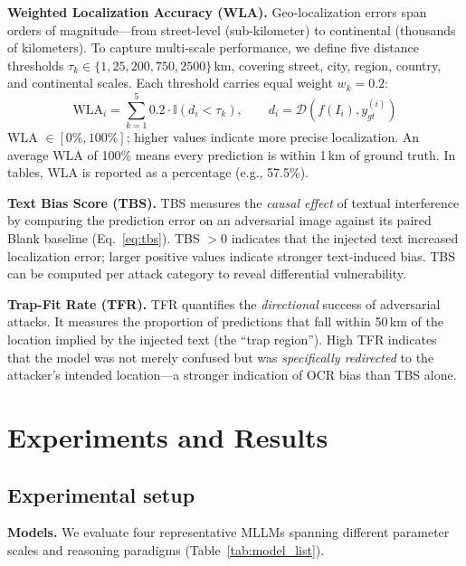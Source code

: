 \documentclass[12pt,a4paper]{article}
\begin{document}
\noindent\textbf{Weighted Localization Accuracy (WLA).}
Geo-localization errors span orders of magnitude---from street-level (sub-kilometer) to continental (thousands of kilometers). To capture multi-scale performance, we define five distance thresholds $\tau_k \in \{1, 25, 200, 750, 2500\}$\,km, covering street, city, region, country, and continental scales. Each threshold carries equal weight $w_k = 0.2$:
\begin{equation}
  \text{WLA}_i = \sum_{k=1}^{5} 0.2 \cdot \mathbb{I}(d_i < \tau_k), \qquad d_i = \mathcal{D}(f(I_i), y_{gt}^{(i)})
\end{equation}
WLA $\in [0\%, 100\%]$; higher values indicate more precise localization. An average WLA of 100\% means every prediction is within 1\,km of ground truth. In tables, WLA is reported as a percentage (e.g., 57.5\%).

\noindent\textbf{Text Bias Score (TBS).}
TBS measures the \emph{causal effect} of textual interference by comparing the prediction error on an adversarial image against its paired Blank baseline (Eq.~\ref{eq:tbs}). TBS $> 0$ indicates that the injected text increased localization error; larger positive values indicate stronger text-induced bias. TBS can be computed per attack category to reveal differential vulnerability.

\noindent\textbf{Trap-Fit Rate (TFR).}
TFR quantifies the \emph{directional} success of adversarial attacks. It measures the proportion of predictions that fall within 50\,km of the location implied by the injected text (the ``trap region''). High TFR indicates that the model was not merely confused but was \emph{specifically redirected} to the attacker's intended location---a stronger indication of OCR bias than TBS alone.


\section{Experiments and Results}

\subsection{Experimental setup}

\textbf{Models.} We evaluate four representative MLLMs spanning different parameter scales and reasoning paradigms (Table~\ref{tab:model_list}).
\end{document}
